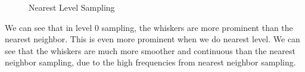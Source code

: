 \documentclass{article}
\begin{document}
\begin{figure}[H]
    \centering
    \caption{Nearest Level Sampling}
    \label{ref_label_overall}
\end{figure}
We can see that in level 0 sampling, the whiskers are more prominent than the nearest neighbor. This is even more prominent when we do nearest level. We can see that the whiskers are much more smoother and continuous than the nearest neighbor sampling, due to the high frequencies from nearest neighbor sampling. 
\end{document}
